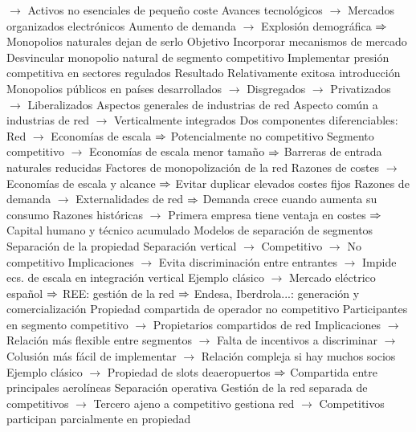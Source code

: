 \documentclass{nuevotema}
\begin{document}
\begin{esquemal}
				\4[] $\to$ Activos no esenciales de pequeño coste
				\4[] Avances tecnológicos
				\4[] $\to$ Mercados organizados electrónicos
				\4[] Aumento de demanda
				\4[] $\to$ Explosión demográfica
				\4[] $\Rightarrow$ Monopolios naturales dejan de serlo
				\4 Objetivo
				\4[] Incorporar mecanismos de mercado
				\4[] Desvincular monopolio natural de segmento competitivo
				\4[] Implementar presión competitiva en sectores regulados
				\4 Resultado
				\4[] Relativamente exitosa introducción
				\4[] Monopolios públicos en países desarrollados
				\4[] $\to$ Disgregados
				\4[] $\to$ Privatizados
				\4[] $\to$ Liberalizados
			\3 Aspectos generales de industrias de red
				\4 Aspecto común a industrias de red
				\4[] $\to$ Verticalmente integrados
				\4 Dos componentes diferenciables:
				\4[--] Red
				\4[] $\to$ Economías de escala
				\4[] $\Rightarrow$ Potencialmente no competitivo
				\4[--] Segmento competitivo
				\4[] $\to$ Economías de escala menor tamaño
				\4[] $\Rightarrow$ Barreras de entrada naturales reducidas
				\4 Factores de monopolización de la red
				\4[--] Razones de costes
				\4[] $\to$ Economías de escala y alcance
				\4[] $\Rightarrow$ Evitar duplicar elevados costes fijos
				\4[--] Razones de demanda
				\4[] $\to$ Externalidades de red
				\4[] $\Rightarrow$ Demanda crece cuando aumenta su consumo
				\4[--] Razones históricas
				\4[] $\to$ Primera empresa tiene ventaja en costes
				\4[] $\Rightarrow$ Capital humano y técnico acumulado
			\3 Modelos de separación de segmentos
				\4 Separación de la propiedad
				\4[] Separación vertical
				\4[] $\to$ Competitivo
				\4[] $\to$ No competitivo
				\4[] Implicaciones
				\4[] $\to$ Evita discriminación entre entrantes
				\4[] $\to$ Impide ecs. de escala en integración vertical
				\4[] Ejemplo clásico
				\4[] $\to$ Mercado eléctrico español
				\4[] $\Rightarrow$ REE: gestión de la red
				\4[] $\Rightarrow$ Endesa, Iberdrola...: generación y comercialización
				\4 Propiedad compartida de operador no competitivo
				\4[] Participantes en segmento competitivo
				\4[] $\to$ Propietarios compartidos de red
				\4[] Implicaciones
				\4[] $\to$ Relación más flexible entre segmentos
				\4[] $\to$ Falta de incentivos a discriminar
				\4[] $\to$ Colusión más fácil de implementar
				\4[] $\to$ Relación compleja si hay muchos socios
				\4[] Ejemplo clásico
				\4[] $\to$ Propiedad de slots deaeropuertos
				\4[] $\Rightarrow$ Compartida entre principales aerolíneas
				\4 Separación operativa
				\4[] Gestión de la red separada de competitivos
				\4[] $\to$ Tercero ajeno a competitivo gestiona red
				\4[] $\to$ Competitivos participan parcialmente en propiedad

\end{esquemal}
\end{document}
